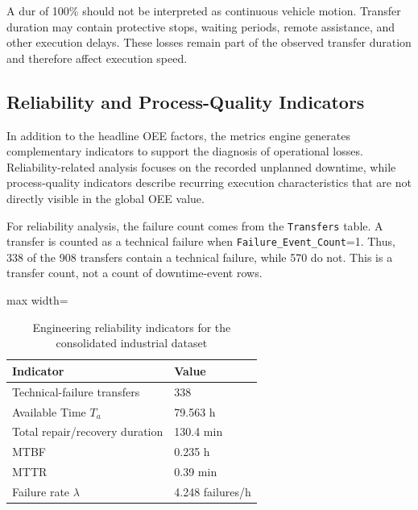 A \acrshort{dur} of 100\% should not be interpreted as continuous vehicle motion. Transfer duration may contain protective stops, waiting periods, remote assistance, and other execution delays. These losses remain part of the observed transfer duration and therefore affect execution speed.

\subsection{Reliability and Process-Quality Indicators}
\label{subsec:reliability-and-process-quality-indicators}
In addition to the headline OEE factors, the metrics engine generates complementary indicators to support the diagnosis of operational losses. Reliability-related analysis focuses on the recorded unplanned downtime, while process-quality indicators describe recurring execution characteristics that are not directly visible in the global OEE value.

For reliability analysis, the failure count comes from the \texttt{Transfers} table. A transfer is counted as a technical failure when \texttt{Failure\_Event\_Count}=1. Thus, 338 of the 908 transfers contain a technical failure, while 570 do not. This is a transfer count, not a count of downtime-event rows.

\begin{table}[H]
\small
\renewcommand{\arraystretch}{1.3}
\centering
\caption{Engineering reliability indicators for the consolidated industrial dataset}
\label{tab:engineering-reliability-indicators-consolidated-dataset}
\begin{adjustbox}{max width=\textwidth}
\begin{tabular}{|p{6.8cm}|p{3.2cm}|}
\hline
\textbf{Indicator} & \textbf{Value} \\
\hline
Technical-failure transfers & 338 \\
\hline
Available Time $T_a$ & 79.563 h \\
\hline
Total repair/recovery duration & 130.4 min \\
\hline
MTBF & 0.235 h \\
\hline
MTTR & 0.39 min \\
\hline
Failure rate $\lambda$ & 4.248 failures/h \\
\hline
\end{tabular}
\end{adjustbox}
\end{table}


